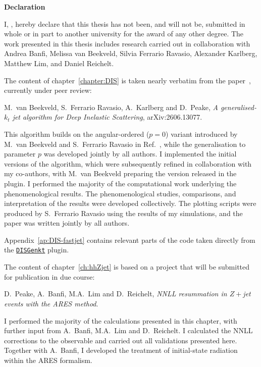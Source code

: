 \pagestyle{empty}%
\begin{center}
	\Huge \textbf{Declaration}
	\hrulefill
\end{center}
\begin{flushleft}
	{
	\noindent I, \myName, hereby declare that this thesis has not been, and will not be, submitted in whole or in part to
	another university for the award of any other degree. The work presented in this thesis includes research
	carried out in collaboration with Andrea Banfi, Melissa van Beekveld, Silvia Ferrario Ravasio, Alexander Karlberg, 
	Matthew Lim, and Daniel Reichelt.
		
	The content of chapter~\ref{chapter:DIS} is taken nearly verbatim from the paper~\cite{vanBeekveld:2026rez},
	currently under peer review:
	
	M.~van Beekveld, S.~Ferrario Ravasio, A.~Karlberg and D.~Peake,
	\textit{A generalised-$k_t$ jet algorithm for Deep Inelastic Scattering},
	arXiv:2606.13077.
	
	This algorithm builds on the angular-ordered ($p=0$) variant introduced by
	M.~van Beekveld and S.~Ferrario Ravasio in Ref.~\cite{vanBeekveld:2023chs},
	while the generalisation to parameter $p$ was developed jointly by all
	authors. I implemented the initial versions of the algorithm, which were subsequently 
	refined in collaboration with my co-authors, with M.~van Beekveld preparing the version released in the
	plugin. I performed the majority of the computational work underlying the
	phenomenological results. The phenomenological studies, comparisons, and interpretation of the results
	were developed collectively. The plotting scripts were produced
	by S.~Ferrario Ravasio using the results of my simulations, and the paper
	was written jointly by all authors.
	
	Appendix~\ref{ap:DIS-fastjet} contains
	relevant parts of the code taken directly from the
	\href{https://repo.hepforge.org/source/fastjetsvn/browse/contrib/contribs/DISGenkt}
	{\texttt{DISGenkt}} plugin.
	
	The content of chapter~\ref{ch:hhZjet} is based on a project that will be
	submitted for publication in due course:
	
	D.~Peake, A.~Banfi, M.A.~Lim and D.~Reichelt, \textit{NNLL resummation in
	$Z+$jet events with the ARES method}.
	
	I performed the majority of the calculations presented in this chapter,
	with further input from A.~Banfi, M.A.~Lim and D.~Reichelt. I calculated the NNLL
	corrections to the observable and carried out all validations
	presented here. Together with A.~Banfi, I developed the treatment of
	initial-state radiation within the ARES formalism.
		\par}
\end{flushleft}
